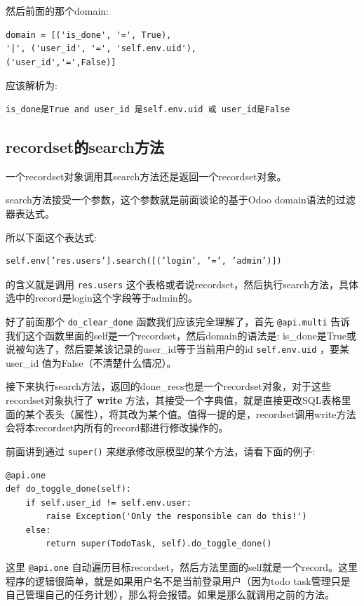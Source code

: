 \documentclass[11pt,a4paper]{sphinxmanual}
\begin{document}
然后前面的那个domain:
\begin{Verbatim}
domain = [('is_done', '=', True),
'|', ('user_id', '=', 'self.env.uid'),
('user_id','=',False)]
\end{Verbatim}
应该解析为:
\begin{Verbatim}
is_done是True and user_id 是self.env.uid 或 user_id是False
\end{Verbatim}


\subsection{recordset的search方法}
\label{sec-8-3-3}
一个recordset对象调用其search方法还是返回一个recordset对象。

search方法接受一个参数，这个参数就是前面谈论的基于Odoo domain语法的过滤器表达式。

所以下面这个表达式:
\begin{Verbatim}
self.env[’res.users’].search([(’login’, ’=’, ’admin’)])
\end{Verbatim}
的含义就是调用 \verb~res.users~ 这个表格或者说recordset，然后执行search方法，具体选中的record是login这个字段等于admin的。


好了前面那个 \verb~do_clear_done~ 函数我们应该完全理解了，首先 \verb~@api.multi~ 告诉我们这个函数里面的self是一个recordset，然后domain的语法是: is\_done是True或说被勾选了，然后要某该记录的user\_id等于当前用户的id \verb~self.env.uid~ ，要某 user\_id 值为False（不清楚什么情况）。

接下来执行search方法，返回的done\_recs也是一个recordset对象，对于这些recordset对象执行了 \textbf{write} 方法，其接受一个字典值，就是直接更改SQL表格里面的某个表头（属性），将其改为某个值。值得一提的是，recordset调用write方法会将本recordset内所有的record都进行修改操作的。


前面讲到通过 \verb~super()~ 来继承修改原模型的某个方法，请看下面的例子:
\begin{Verbatim}
@api.one
def do_toggle_done(self):
    if self.user_id != self.env.user:
        raise Exception('Only the responsible can do this!')
    else:
        return super(TodoTask, self).do_toggle_done()
\end{Verbatim}

这里 \verb~@api.one~ 自动遍历目标recordset，然后方法里面的self就是一个record。这里程序的逻辑很简单，就是如果用户名不是当前登录用户（因为todo task管理只是自己管理自己的任务计划），那么将会报错。如果是那么就调用之前的方法。
\end{document}
